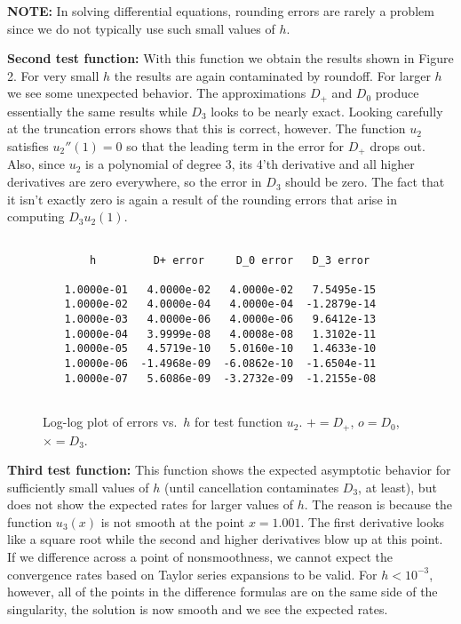\documentclass{article}
\begin{document}
\vskip 5pt
{\bf NOTE:}  In solving differential equations, rounding errors are rarely
a problem since we do not typically use such small values of $h$.

\newpage
{\bf Second test function:}
With this function we obtain the results shown in Figure 2.
For very small $h$ the results are again contaminated by roundoff.  For
larger $h$ we see some unexpected behavior.  The approximations $D_+$ and
$D_0$ produce essentially the same results while $D_3$ looks to be nearly
exact.  Looking carefully at the truncation errors shows that this is
correct, however.  The function $u_2$ satisfies $u_2''(1)=0$ so that the
leading term in the error for $D_+$ drops out.  Also, since $u_2$ is a
polynomial of degree 3, its 4'th derivative and all higher derivatives are
zero everywhere, so the error in $D_3$ should be zero.  The fact that it
isn't exactly zero is again a result of the rounding errors that arise in
computing $D_3 u_2(1)$.

\begin{verbatim}

             h         D+ error     D_0 error   D_3 error

         1.0000e-01   4.0000e-02   4.0000e-02   7.5495e-15
         1.0000e-02   4.0000e-04   4.0000e-04  -1.2879e-14
         1.0000e-03   4.0000e-06   4.0000e-06   9.6412e-13
         1.0000e-04   3.9999e-08   4.0008e-08   1.3102e-11
         1.0000e-05   4.5719e-10   5.0160e-10   1.4633e-10
         1.0000e-06  -1.4968e-09  -6.0862e-10  -1.6504e-11
         1.0000e-07   5.6086e-09  -3.2732e-09  -1.2155e-08


\end{verbatim}


\begin{figure}[h]
\hfil{}\hfil
\caption{Log-log plot of errors vs.\ $h$ for test function $u_2$.
$+=D_+$, $o=D_0$, $\times = D_3$.}
\end{figure}


\newpage
{\bf Third test function:}
This function shows the expected asymptotic behavior for sufficiently small
values of $h$ (until cancellation contaminates $D_3$, at least), but does
not show the expected rates for larger values of $h$.  The reason is
because the function $u_3(x)$ is not smooth at the point $x=1.001$.  
The first derivative looks like a square root while the second 
and higher derivatives blow up at this point.
If we difference across a point of nonsmoothness, we cannot expect the
convergence rates based on Taylor series expansions to be valid.  For
$h<10^{-3}$, however, all of the points in the difference formulas are on
the same side of the singularity, the solution is now smooth and we see
the expected rates.
\end{document}
